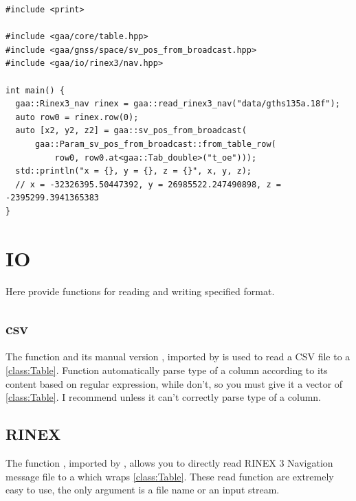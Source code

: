 \documentclass[9pt,a4paper,onecolumn,oneside]{rho-class/rho}
\newcommand{\classref}[1]{\ref{class:#1}}
\begin{document}
\begin{code}
    \caption{Example of sv\_pos\_from\_broadcast}
    \label{lst:sv_pos_from_broadcast}
    \begin{verbatim}
#include <print>

#include <gaa/core/table.hpp>
#include <gaa/gnss/space/sv_pos_from_broadcast.hpp>
#include <gaa/io/rinex3/nav.hpp>

int main() {
  gaa::Rinex3_nav rinex = gaa::read_rinex3_nav("data/gths135a.18f");
  auto row0 = rinex.row(0);
  auto [x2, y2, z2] = gaa::sv_pos_from_broadcast(
      gaa::Param_sv_pos_from_broadcast::from_table_row(
          row0, row0.at<gaa::Tab_double>("t_oe")));
  std::println("x = {}, y = {}, z = {}", x, y, z);
  // x = -32326395.50447392, y = 26985522.247490898, z = -2395299.3941365383
}
    \end{verbatim}
\end{code}

\section{IO}

Here provide functions for reading and writing specified format.

\subsection{csv}
The function \label{func:read_csv_auto} and its manual version , imported by  is used to read a CSV file to a \classref{Table}. Function  automatically parse type of a column according to its content based on regular expression, while  don't, so you must give it a vector of \classref{Table}. I recommend  unless it can't correctly parse type of a column.


\subsection{RINEX}
The function \label{func:read_reinx3_nav} , imported by , allows you to directly read RINEX 3 Navigation message file to a  which wraps \classref{Table}. These read function are extremely easy to use, the only argument is a file name or an input stream.
\end{document}
